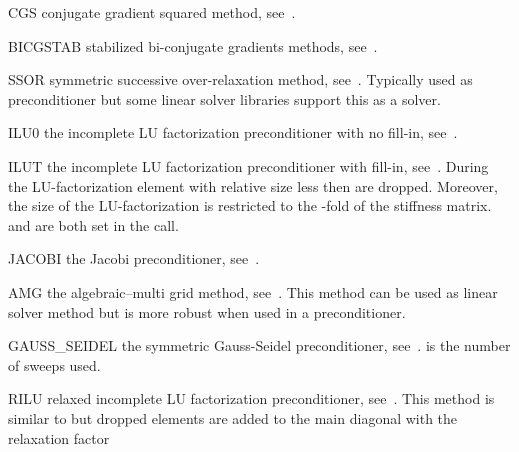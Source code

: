 \begin{memberdesc}[SolverOptions]{CGS}
conjugate gradient squared method, see~.
\end{memberdesc}

\begin{memberdesc}[SolverOptions]{BICGSTAB}
stabilized bi-conjugate gradients methods, see~.
\end{memberdesc}

\begin{memberdesc}[SolverOptions]{SSOR}
symmetric successive over-relaxation method, see~. Typically used as preconditioner but some linear solver libraries support
this as a solver.
\end{memberdesc}

\begin{memberdesc}[SolverOptions]{ILU0}
the incomplete LU factorization preconditioner with no fill-in, see~.
\end{memberdesc}

\begin{memberdesc}[SolverOptions]{ILUT}
the incomplete LU factorization preconditioner with fill-in, see~. During the  LU-factorization element with
relative size less then  are dropped. Moreover, the size of the LU-factorization is restricted to the
-fold of the stiffness matrix.  and  are both set in the
 call.
\end{memberdesc}

\begin{memberdesc}[SolverOptions]{JACOBI}
the Jacobi preconditioner, see~.
\end{memberdesc}


\begin{memberdesc}[SolverOptions]{AMG}
the algebraic--multi grid method, see~. This method can be used as linear solver method but is more robust when used
in a preconditioner.
\end{memberdesc}

\begin{memberdesc}[SolverOptions]{GAUSS_SEIDEL}
the symmetric Gauss-Seidel preconditioner, see~.
 is the number of sweeps used.
\end{memberdesc}

\begin{memberdesc}[SolverOptions]{RILU}
relaxed incomplete LU factorization preconditioner, see~. This method is similar to  but dropped elements are added to the main diagonal 
with the relaxation factor 
\end{memberdesc}


